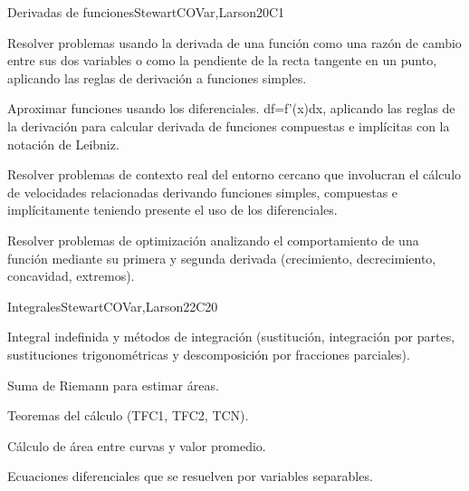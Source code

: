 \begin{syllabus}
\begin{unit}{Derivadas de funciones}{}{StewartCOVar,Larson}{20}{C1}
   \begin{learningoutcomes}
      \item Resolver problemas usando la derivada de una función como una razón de cambio entre sus dos variables o como la pendiente de la recta tangente en un punto, aplicando las reglas de derivación a funciones simples. 
      \item Aproximar funciones usando los diferenciales. df=f'(x)dx, aplicando las reglas de la derivación para calcular derivada de funciones compuestas e implícitas con la notación de Leibniz.
      \item Resolver problemas de contexto real del entorno cercano que involucran el cálculo de velocidades relacionadas derivando funciones simples, compuestas e implícitamente teniendo presente el uso de los diferenciales.
      \item Resolver problemas de optimización analizando el comportamiento de una función mediante su primera y segunda derivada (crecimiento, decrecimiento, concavidad, extremos).
   \end{learningoutcomes}
\end{unit}

\begin{unit}{Integrales}{}{StewartCOVar,Larson}{22}{C20}
   \begin{topics}
      \item Integral indefinida y métodos de integración (sustitución, integración por partes, sustituciones trigonométricas y descomposición por fracciones parciales).
      \item Suma de Riemann para estimar áreas.
      \item Teoremas del cálculo (TFC1, TFC2, TCN).
      \item Cálculo de área entre curvas y valor promedio.
      \item Ecuaciones diferenciales que se resuelven por variables separables.
   \end{topics}


\end{unit}
\end{syllabus}
